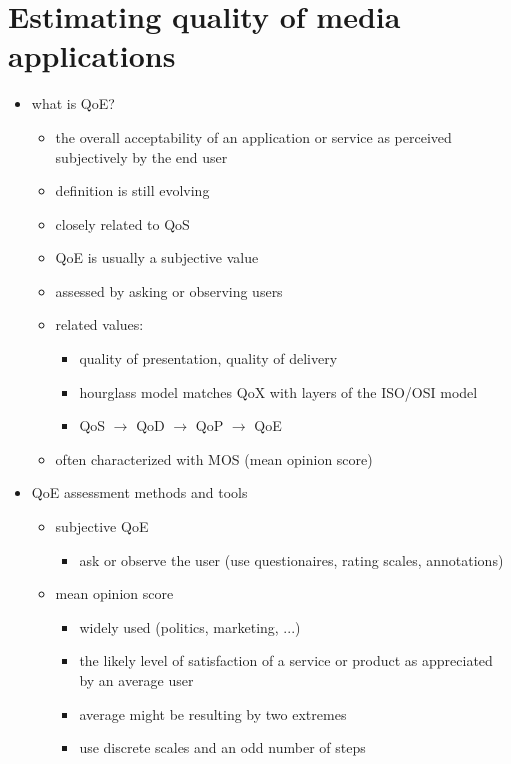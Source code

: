 \documentclass[a4paper,10pt]{scrreprt}
\begin{document}
\section{Estimating quality of media applications}
\begin{itemize}
 \item what is QoE? 
 \begin{itemize}
  \item the overall acceptability of an application or service as perceived subjectively by the end user
  \item definition is still evolving
  \item closely related to QoS
  \item QoE is usually a subjective value 
  \item assessed by asking or observing users 
 \end{itemize}
 \begin{itemize}
 \item related values: 
 \begin{itemize}
  \item quality of presentation, quality of delivery 
  \item hourglass model matches QoX with layers of the ISO/OSI model 
  \item QoS $\rightarrow$ QoD $\rightarrow$ QoP $\rightarrow$ QoE 
 \end{itemize}
 \item often characterized with MOS (mean opinion score)
\end{itemize}
\item QoE assessment methods and tools 
\begin{itemize}
 \item subjective QoE 
 \begin{itemize}
  \item ask or observe the user (use questionaires, rating scales, annotations)
 \end{itemize}
 \item mean opinion score 
 \begin{itemize}
  \item widely used (politics, marketing, ...)
  \item the likely level of satisfaction of a service or product as appreciated by an average user
  \item average might be resulting by two extremes 
  \item use discrete scales and an odd number of steps
 \end{itemize}

\end{itemize}
\end{itemize}
\end{document}

